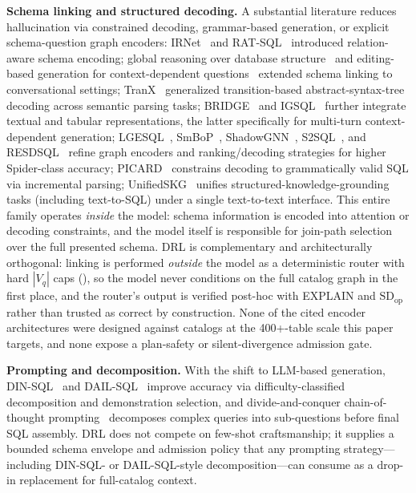 \documentclass[twocolumn]{svjour3}
\begin{document}
\textbf{Schema linking and structured decoding.}
A substantial literature reduces hallucination via constrained decoding, grammar-based generation, or explicit schema-question graph encoders: IRNet~\cite{guo2019irnet} and RAT-SQL~\cite{wang2020ratsql} introduced relation-aware schema encoding; global reasoning over database structure~\cite{bogin2019global} and editing-based generation for context-dependent questions~\cite{zhang2019editing} extended schema linking to conversational settings; TranX~\cite{yin2018tranx} generalized transition-based abstract-syntax-tree decoding across semantic parsing tasks; BRIDGE~\cite{lin2020bridge} and IGSQL~\cite{cai2020igsql} further integrate textual and tabular representations, the latter specifically for multi-turn context-dependent generation; LGESQL~\cite{cao2021lgesql}, SmBoP~\cite{rubin2021smbop}, ShadowGNN~\cite{chen2021shadowgnn}, S2SQL~\cite{hui2022s2sql}, and RESDSQL~\cite{li2023resdsql} refine graph encoders and ranking/decoding strategies for higher Spider-class accuracy; PICARD~\cite{scholak2021picard} constrains decoding to grammatically valid SQL via incremental parsing; UnifiedSKG~\cite{xie2022unifiedskg} unifies structured-knowledge-grounding tasks (including text-to-SQL) under a single text-to-text interface.
This entire family operates \emph{inside} the model: schema information is encoded into attention or decoding constraints, and the model itself is responsible for join-path selection over the full presented schema.
DRL is complementary and architecturally orthogonal: linking is performed \emph{outside} the model as a deterministic router with hard $|V_q|$ caps (), so the model never conditions on the full catalog graph in the first place, and the router's output is verified post-hoc with EXPLAIN and $\text{SD}_{\text{op}}$ rather than trusted as correct by construction. None of the cited encoder architectures were designed against catalogs at the 400+-table scale this paper targets, and none expose a plan-safety or silent-divergence admission gate.

\textbf{Prompting and decomposition.}
With the shift to LLM-based generation, DIN-SQL~\cite{pourreza2023dinsql} and DAIL-SQL~\cite{gao2023dail} improve accuracy via difficulty-classified decomposition and demonstration selection, and divide-and-conquer chain-of-thought prompting~\cite{liu2023divide} decomposes complex queries into sub-questions before final SQL assembly.
DRL does not compete on few-shot craftsmanship; it supplies a bounded schema envelope and admission policy that any prompting strategy---including DIN-SQL- or DAIL-SQL-style decomposition---can consume as a drop-in replacement for full-catalog context.
\end{document}
